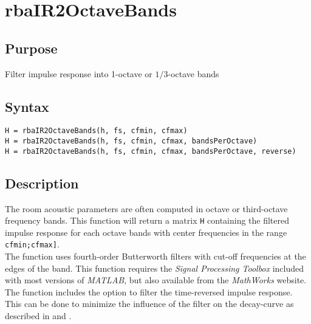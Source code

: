 
\chapter{rbaIR2OctaveBands} %
\label{cha:rbaIR2OctaveBands} %

\section{Purpose} %
\label{sec:rbaIR2OctaveBands_purpose}

Filter impulse response into 1-octave or $1/3$-octave bands


\section{Syntax} %
\label{sec:rbaIR2OctaveBands_syntax}


  \texttt{H = rbaIR2OctaveBands(h, fs, cfmin, cfmax)} \\
  \texttt{H = rbaIR2OctaveBands(h, fs, cfmin, cfmax, bandsPerOctave)} \\
  \texttt{H = rbaIR2OctaveBands(h, fs, cfmin, cfmax, bandsPerOctave, reverse)}




\section{Description} %
\label{sec:rbaIR2OctaveBands_description}
The room acoustic parameters are often computed in octave or third-octave frequency bands. This function will return a matrix \texttt{H} containing the filtered impulse response for each octave bands with center frequencies in the range \texttt{cfmin;cfmax]}.
\\
The function uses fourth-order Butterworth filters with cut-off frequencies at the edges of the band. This function requires the \emph{Signal Processing Toolbox} included with most versions of \emph{MATLAB}, but also available from the \emph{MathWorks} website.\\
The function includes the option to filter the time-reversed impulse response. This can be done to minimize the influence of the filter on the decay-curve as described in \cite{} and \cite{}.



